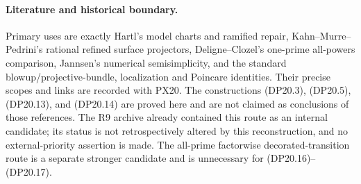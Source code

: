 \paragraph{Literature and historical boundary.}
Primary uses are exactly Hartl's model charts and ramified repair,
Kahn--Murre--Pedrini's rational refined surface projectors,
Deligne--Clozel's one-prime all-powers comparison, Jannsen's
numerical semisimplicity, and the standard blowup/projective-bundle,
localization and Poincare identities. Their precise scopes and
links are recorded with PX20. The constructions (DP20.3),
(DP20.5), (DP20.13), and (DP20.14) are proved here and are not
claimed as conclusions of those references. The R9 archive
already contained this route as an internal candidate; its
status is not retrospectively altered by this reconstruction,
and no external-priority assertion is made. The all-prime
factorwise decorated-transition route is a separate stronger
candidate and is unnecessary for (DP20.16)--(DP20.17).
